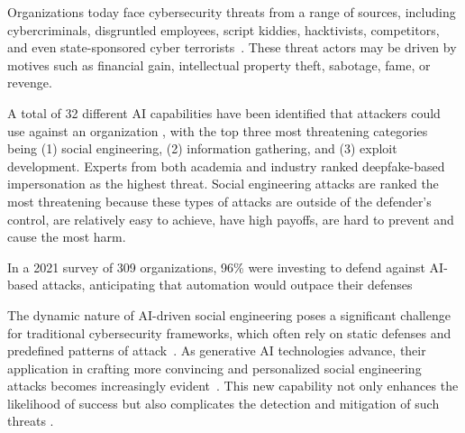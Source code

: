 






%
%
Organizations today face cybersecurity threats from a range of sources, including cybercriminals, disgruntled employees, script kiddies, hacktivists, competitors, and even state-sponsored cyber terrorists~\citep{mirsky_Threat_Offensive_AI_Organizations_2023}. These threat actors may be driven by motives such as financial gain, intellectual property theft, sabotage, fame, or revenge.








%
%
A total of 32 different AI capabilities have been identified that attackers could use against an organization \citep{mirsky_Threat_Offensive_AI_Organizations_2023}, with the top three most threatening categories being (1) social engineering, (2) information gathering, and (3) exploit development. Experts from both academia and industry ranked deepfake-based impersonation as the highest threat. Social engineering attacks are ranked the most threatening because these types of attacks are outside of the defender's control, are relatively easy to achieve, have high payoffs, are hard to prevent and cause the most harm.

In a 2021 survey of 309 organizations, 96\% were investing to defend against AI-based attacks, anticipating that automation would outpace their defenses \citep{NULL}



The dynamic nature of AI-driven social engineering poses a significant challenge for traditional cybersecurity frameworks, which often rely on static defenses and predefined patterns of attack~\citep{NULL}. As generative AI technologies advance, their application in crafting more convincing and personalized social engineering attacks becomes increasingly evident~\citep{blauth_AI_Crime_Overview_Malicious_Use_Abuse_2022}. This new capability not only enhances the likelihood of success but also complicates the detection and mitigation of such threats \citep{mirsky_Threat_Offensive_AI_Organizations_2023}.



